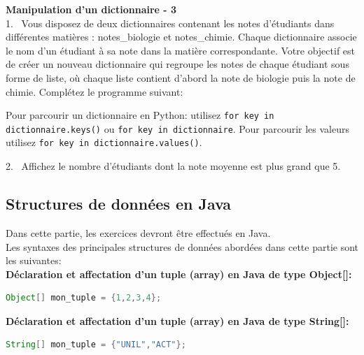     \begin{Exercice}[5 minutes] [Python] \textbf{Manipulation d'un dictionnaire - 3}\\
      	
        1. \ Vous disposez de deux dictionnaires contenant les notes d'étudiants dans différentes matières : notes\_biologie et notes\_chimie. Chaque dictionnaire associe le nom d'un étudiant à sa note dans la matière correspondante. Votre objectif est de créer un nouveau dictionnaire qui regroupe les notes de chaque étudiant sous forme de liste, où chaque liste contient d'abord la note de biologie puis la note de chimie. Complétez le programme suivant: \\

        \begin{conseil}
            Pour parcourir un dictionnaire en Python: utilisez \texttt{for key in dictionnaire.keys()} ou \texttt{for key in dictionnaire}. Pour parcourir les valeurs utilisez \texttt{for key in dictionnaire.values()}.
        \end{conseil}
       
      	 
      	2. \ Affichez le nombre d'étudiants dont la note moyenne est plus grand que 5.

        \begin{solution}
            
        \end{solution}
        \begin{solution}
            
        \end{solution}
    \end{Exercice}
    
    \subsection{Structures de données en Java}
    Dans cette partie, les exercices devront être effectués en Java. \\
    Les syntaxes des principales structures de données abordées dans cette partie sont les suivantes: \\
    \textbf{Déclaration et affectation d'un tuple (array) en Java de type Object[]:}
     \begin{lstlisting}[language=Java]
Object[] mon_tuple = {1,2,3,4}; \end{lstlisting} 
\textbf{Déclaration et affectation d'un tuple (array) en Java de type String[]:}
     \begin{lstlisting}[language=Java]
String[] mon_tuple = {"UNIL","ACT"}; \end{lstlisting} 

